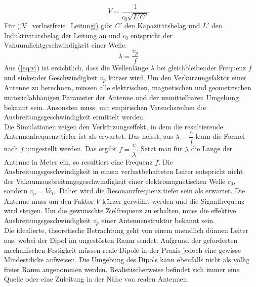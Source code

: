 \begin{equation}\label{V_verlustfreie_Leitung}
V=\dfrac{1}{c_0 \sqrt{L'C'}} 
\end{equation}
Für (\ref{V_verlustfreie_Leitung}) gibt $C'$ den Kapazitätsbelag und $L'$ den Induktivitätsbelag der Leitung an und $c_0$ entspricht der Vakuumlichtgeschwindigkeit einer Welle.
\begin{equation}\label{eq:v}
\lambda=\dfrac{v_p}{f}
\end{equation} 
Aus (\ref{eq:v}) ist ersichtlich, dass die Wellenlänge $\lambda$ bei gleichbleibender Frequenz $f$ und sinkender Geschwindigkeit $v_p$ kürzer wird. 
Um den Verkürzungsfaktor einer Antenne zu berechnen, müssen alle elektrischen, magnetischen und geometrischen materialabhänigen Parameter der Antenne und der unmittelbaren Umgebung bekannt sein. Ansonsten muss, mit empirischen Versuchsreihen die Ausbreitungsgeschwindigkeit ermittelt werden.\\

\newpage
Die Simulationen zeigen den Verkürzungseffekt, in dem die resultierende Antennenfrequenz tiefer ist als erwartet. Das heisst, aus $\lambda = \dfrac{c}{f}$ kann die Formel nach $f$ umgestellt werden. Das ergibt $f=\dfrac{c}{\lambda}$. Setzt man für $\lambda$ die Länge der Antenne in Meter ein, so resultiert eine Frequenz $f$. Die Ausbreitungsgeschwindigkeit in einem verlustbehafteten Leiter entspricht nicht der Vakuumausbreitungsgeschwindigkeit einer elektromagnetischen Welle $c_0$, sondern $v_p=V c_0$. Daher wird die Resonanzfrequenz tiefer sein als erwartet. Die Antenne muss um den Faktor  $V$ kürzer gerwählt werden und die Signalfrequenz wird steigen. Um die gewünschte Zielfrequenz zu erhalten, muss die effektive Ausbreitungsgeschwindigkeit $v_p$ einer Antennenstruktur bekannt sein.\\

Die idealierte, theoretische Betrachtung geht von einem unendlich dünnen Leiter aus, wobei der Dipol im ungestörten Raum sendet. Aufgrund der geforderten mechanischen Festigkeit müssen reale Dipole in der Praxis jedoch eine gewisse Mindestdicke aufweisen. Die Umgebung des Dipols kann ebenfalls nicht als völlig freier Raum angenommen werden. Realistischerweise befindet sich immer eine Quelle oder eine Zuleitung in der Nähe von realen Antennen. \\

